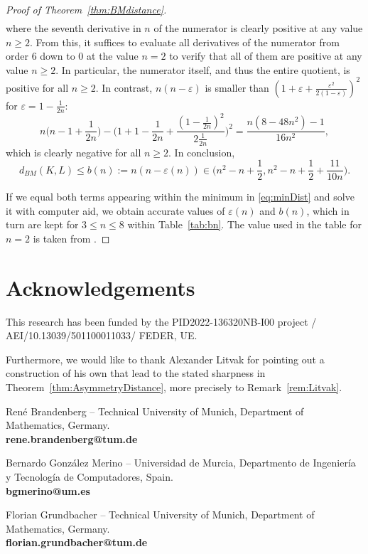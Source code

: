 \documentclass{amsart}
\begin{document}
\begin{proof}[Proof of Theorem~\ref{thm:BMdistance}]
\begin{align*}
\end{align*}
where the seventh derivative in $n$ of the numerator is clearly positive at any value $n \geq 2$.
From this, it suffices to evaluate all derivatives of the numerator from order $6$ down to $0$ at the value $n = 2$ to verify that all of them are positive at any value $n \geq 2$.
In particular, the numerator itself, and thus the entire quotient, is positive for all $n \geq 2$.
In contrast, $n (n - \varepsilon)$ is smaller than $(1+\varepsilon+\frac{\varepsilon^2}{2(1-\varepsilon)})^2$ for $\varepsilon = 1 - \frac{1}{2n}$:
\[
    n \bigg( n-1+\frac{1}{2n} \bigg) - \Bigg( 1+1-\frac{1}{2n} + \frac{(1-\frac{1}{2n})^2}{2 \frac{1}{2n}} \Bigg)^2
    = \frac{n (8 - 48 n^2) - 1}{16 n^2},
\]
which is clearly negative for all $n \geq 2$.
In conclusion,
\[
    d_{BM}(K,L)
    \leq b(n)
    := n (n - \varepsilon(n))
    \in \bigg( n^2 - n + \frac{1}{2}, n^2 - n + \frac{1}{2} + \frac{11}{10n} \bigg).
\]

If we equal both terms appearing within the minimum in \eqref{eq:minDist} and solve it with computer aid, we obtain accurate values of $\varepsilon(n)$ and $b(n)$, which in turn are kept for $3 \leq n \leq 8$ within Table~\ref{tab:bn}.
The value used in the table for $n = 2$ is taken from \cite{2018:BrodiukPalkoPrymak}.
\end{proof}





\section*{Acknowledgements}



\noindent This research has been funded by the PID2022-136320NB-I00 project / AEI/10.13039/501100011033/ FEDER, UE.

\noindent Furthermore, we would like to thank Alexander Litvak for pointing out a construction of his own that lead to the stated sharpness in Theorem~\ref{thm:AsymmetryDistance}, more precisely to Remark~\ref{rem:Litvak}.





\printbibliography





\bigskip



René Brandenberg --
Technical University of Munich, Department of Mathematics, Germany. \\
\textbf{rene.brandenberg@tum.de}

Bernardo Gonz\'alez Merino --
Universidad de Murcia, Departmento de Ingenier\'ia y Tecnolog\'ia de Computadores, Spain. \\
\textbf{bgmerino@um.es}

Florian Grundbacher --
Technical University of Munich, Department of Mathematics, Germany. \\
\textbf{florian.grundbacher@tum.de}



\vfill\eject
\end{document}
